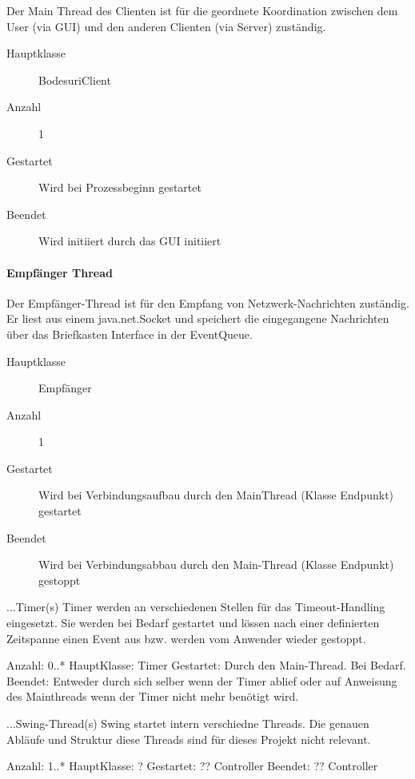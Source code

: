 \documentclass[12pt,halfparskip]{scrartcl}
\begin{document}
Der Main Thread des Clienten ist für die geordnete Koordination zwischen dem User (via GUI) und den anderen Clienten (via Server) zuständig.

\begin{description}
	\item[Hauptklasse] BodesuriClient
	\item[Anzahl] 1
	\item[Gestartet] Wird bei Prozessbeginn gestartet
	\item[Beendet] Wird initiiert durch das GUI initiiert
\end{description}


\paragraph{Empfänger Thread} %
\label{ssub:empfänger_thread}

Der Empfänger-Thread ist für den Empfang von Netzwerk-Nachrichten zuständig. Er liest aus einem java.net.Socket und speichert die eingegangene Nachrichten über das Briefkasten Interface in der EventQueue.

\begin{description}
	\item[Hauptklasse] Empfänger
	\item[Anzahl] 1
	\item[Gestartet] Wird bei Verbindungsaufbau durch den MainThread (Klasse Endpunkt) gestartet 
	\item[Beendet] Wird bei Verbindungsabbau durch den Main-Thread (Klasse Endpunkt) gestoppt
\end{description}



...Timer(s)
Timer werden an verschiedenen Stellen für das Timeout-Handling eingesetzt. Sie werden bei Bedarf gestartet und lössen nach einer definierten Zeitspanne einen Event aus bzw. werden vom Anwender wieder gestoppt.

Anzahl: 0..*
HauptKlasse: Timer
Gestartet: Durch den Main-Thread. Bei Bedarf.
Beendet: Entweder durch sich selber wenn der Timer ablief oder auf Anweisung des Mainthreads wenn der Timer nicht mehr benötigt wird. 


...Swing-Thread(s)
Swing startet intern verschiedne Threads. Die genauen Abläufe und Struktur diese Threads sind für dieses Projekt nicht relevant.

Anzahl: 1..*
HauptKlasse: ?
Gestartet: ?? Controller
Beendet: ?? Controller
\end{document}

